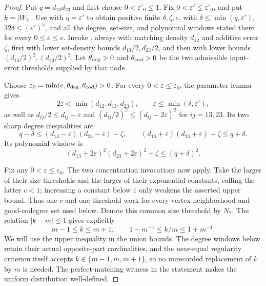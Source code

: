 \begin{proof}
Put $q=d_{13}d_{23}$ and first choose $0<\varepsilon'_0\leq1$.
Fix $0<\varepsilon'\leq\varepsilon'_0$, and put $k=|W_3|$.
Use  with $\eta=\varepsilon'$
to obtain positive finite $\delta,\zeta,e$, with
$\delta\leq\min(q,\varepsilon')$, $32\delta\leq(\varepsilon')^5$,
and all the degree, set-size, and polynomial windows stated there for
every $0\leq\varepsilon\leq e$.
Invoke , always with matching
density $d_{12}$ and additive error $\zeta$, first with lower set-density
bounds $d_{13}/2,d_{23}/2$, and then with lower bounds
$(d_{13}/2)^2,(d_{23}/2)^2$.  Let $\theta_{\rm deg}>0$ and
$\theta_{\rm cod}>0$ be the two admissible input-error thresholds supplied
by that node.

Choose $\varepsilon_0=\min(e,\theta_{\rm deg},\theta_{\rm cod})>0$.
For every $0<\varepsilon\leq\varepsilon_0$, the parameter lemma gives
\[
 2\varepsilon<\min(d_{12},d_{13},d_{23}),\qquad
 \varepsilon\leq\min(\delta,\varepsilon'),
\]
as well as $d_{ij}/2\leq d_{ij}-\varepsilon$ and
$(d_{ij}/2)^2\leq(d_{ij}-2\varepsilon)^2$ for $ij=13,23$.
Its two sharp degree inequalities are
\[
 q-\delta\leq(d_{13}-\varepsilon)(d_{23}-\varepsilon)-\zeta,
 \qquad
 (d_{13}+\varepsilon)(d_{23}+\varepsilon)+\zeta\leq q+\delta.
\]
Its polynomial window is
\[
 (d_{13}+2\varepsilon)^2(d_{23}+2\varepsilon)^2+\zeta
 \leq(q+\delta)^2.
\tag{1}
\]

Fix any $0<\varepsilon\leq\varepsilon_0$.  The two concentration
invocations now apply.  Take the larger of their size thresholds and the
larger of their exponential constants, calling the latter $c<1$; increasing
a constant below $1$ only weakens the asserted upper bound.  Thus one $c$
and one threshold work for every vertex-neighborhood and good-codegree set
used below.  Denote this common size threshold by $N_*$.  The relation
$|k-m|\leq1$ gives explicitly
\[
 m-1\leq k\leq m+1,
 \qquad 1-m^{-1}\leq k/m\leq1+m^{-1}.
\tag{2}
\]
We will use the upper inequality in the union bounds.  The degree windows
below retain their actual opposite-part cardinalities, and the near-equal
regularity criterion itself accepts $k\in\{m-1,m,m+1\}$, so no unrecorded
replacement of $k$ by $m$ is needed.  The perfect-matching witness in the
statement makes the uniform distribution well-defined.


\end{proof}
